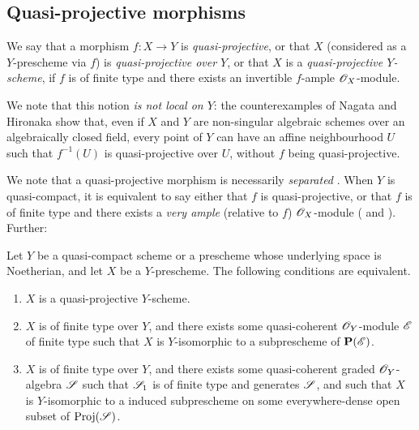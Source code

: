 \subsection{Quasi-projective morphisms}
\label{subsection:quasi-projective-morphisms}

\begin{defn}[5.3.1]
\label{2.5.3.1}
We say that a morphism $f:X\to Y$ is \emph{quasi-projective}, or that $X$ (considered as a $Y$-prescheme via $f$) is \emph{quasi-projective over $Y$}, or that $X$ is a \emph{quasi-projective $Y$-scheme}, if $f$ is of finite type and there exists an invertible $f$-ample $\mathscr{O}_X$-module.
\end{defn}

We note that this notion \emph{is not local on $Y$}:
the counterexamples of Nagata \cite{II-26} and Hironaka show that, even if $X$ and $Y$ are non-singular algebraic schemes over an algebraically closed field, every point of $Y$ can have an affine neighbourhood $U$ such that $f^{-1}(U)$ is quasi-projective over $U$, without $f$ being quasi-projective.

We note that a quasi-projective morphism is necessarily \emph{separated} .
When $Y$ is quasi-compact, it is equivalent to say either that $f$ is quasi-projective, or that $f$ is of finite type and there exists a \emph{very ample} (relative to $f$) $\mathscr{O}_X$-module ( and ).
Further:

\begin{prop}[5.3.2]
\label{2.5.3.2}
Let $Y$ be a quasi-compact scheme or a prescheme whose underlying space is Noetherian, and let $X$ be a $Y$-prescheme.
The following conditions are equivalent.
\begin{enumerate}[label=\emph{(\alph*)}]
  \item $X$ is a quasi-projective $Y$-scheme.
  \item $X$ is of finite type over $Y$, and there exists some quasi-coherent $\mathscr{O}_Y$-module $\mathscr{E}$ of finite type such that $X$ is $Y$-isomorphic to a subprescheme of $\mathbf{P}(\mathscr{E})$.
  \item $X$ is of finite type over $Y$, and there exists some quasi-coherent graded $\mathscr{O}_Y$-algebra $\mathscr{S}$ such that $\mathscr{S}_1$ is of finite type and generates $\mathscr{S}$, and such that $X$ is $Y$-isomorphic to a induced subprescheme on some everywhere-dense open subset of ${\mathop{\mathrm{Proj}}\nolimits}(\mathscr{S})$.
\end{enumerate}
\end{prop}

